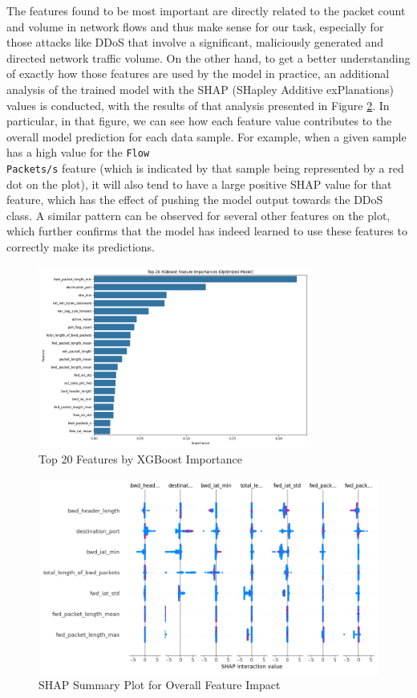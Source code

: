 The features found to be most important are directly related to the packet count and volume in network flows and thus make sense for our task, especially for those attacks like DDoS that involve a significant, maliciously generated and directed network traffic volume. On the other hand, to get a better understanding of exactly how those features are used by the model in practice, an additional analysis of the trained model with the SHAP (SHapley Additive exPlanations) values is conducted, with the results of that analysis presented in Figure \ref{fig:shap_summary_plot}. In particular, in that figure, we can see how each feature value contributes to the overall model prediction for each data sample. For example, when a given sample has a high value for the \texttt{Flow\\ Packets/s} feature (which is indicated by that sample being represented by a red dot on the plot), it will also tend to have a large positive SHAP value for that feature, which has the effect of pushing the model output towards the DDoS class. A similar pattern can be observed for several other features on the plot, which further confirms that the model has indeed learned to use these features to correctly make its predictions.


\begin{figure}[H]
	\centering
	\includegraphics[width=0.8\textwidth]{assets/figures/results/xgboost_feature_importance.png}
	\caption{Top 20 Features by XGBoost Importance}
	\label{fig:xgboost_feature_importance}
\end{figure}

\begin{figure}[H]
	\centering
	\includegraphics[width=1\textwidth]{assets/figures/results/shap_summary_plot_overall.png}
	\caption{SHAP Summary Plot for Overall Feature Impact}
	\label{fig:shap_summary_plot}
\end{figure}

